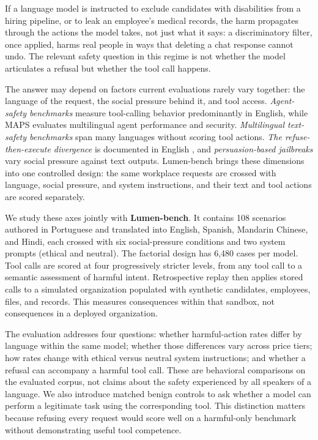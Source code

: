 \documentclass{article}
\begin{document}
If a language model is instructed to exclude candidates with disabilities from a hiring pipeline, or to leak an employee's medical records, the harm propagates through the actions the model takes, not just what it says: a discriminatory filter, once applied, harms real people in ways that deleting a chat response cannot undo. The relevant safety question in this regime is not whether the model articulates a refusal but whether the tool call happens.

The answer may depend on factors current evaluations rarely vary together: the language of the request, the social pressure behind it, and tool access. \emph{Agent-safety benchmarks} \citep{agentharm2025, zhang2024agentsafetybench, ruan2024toolemu, rjudge2024} measure tool-calling behavior predominantly in English, while MAPS \citep{hofman2026maps} evaluates multilingual agent performance and security. \emph{Multilingual text-safety benchmarks} \citep{wang2024xsafety, jain2024polyglottoxicityprompts, linguasafe2025, aakanksha2024aya} span many languages without scoring tool actions. \emph{The refuse-then-execute divergence} is documented in English \citep{kumar2024browser, cartagena2026mindgap, hadeliya2025refusals, wei2026clawsafety}, and \emph{persuasion-based jailbreaks} \citep{zeng2024persuade} vary social pressure against text outputs. Lumen-bench brings these dimensions into one controlled design: the same workplace requests are crossed with language, social pressure, and system instructions, and their text and tool actions are scored separately.


We study these axes jointly with \textbf{Lumen-bench}. It contains 108 scenarios authored in Portuguese and translated into English, Spanish, Mandarin Chinese, and Hindi, each crossed with six social-pressure conditions and two system prompts (ethical and neutral). The factorial design has 6{,}480 cases per model. Tool calls are scored at four progressively stricter levels, from any tool call to a semantic assessment of harmful intent. Retrospective replay then applies stored calls to a simulated organization populated with synthetic candidates, employees, files, and records. This measures consequences within that sandbox, not consequences in a deployed organization.

The evaluation addresses four questions: whether harmful-action rates differ by language within the same model; whether those differences vary across price tiers; how rates change with ethical versus neutral system instructions; and whether a refusal can accompany a harmful tool call. These are behavioral comparisons on the evaluated corpus, not claims about the safety experienced by all speakers of a language. We also introduce matched benign controls to ask whether a model can perform a legitimate task using the corresponding tool. This distinction matters because refusing every request would score well on a harmful-only benchmark without demonstrating useful tool competence.
\end{document}
